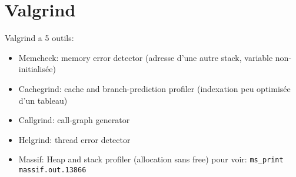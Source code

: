 \section{Valgrind}
Valgrind a 5 outils:
\begin{itemize}
\item Memcheck: memory error detector (adresse d'une autre stack, variable non-initialisée)
\item Cachegrind: cache and branch-prediction profiler (indexation peu optimisée d'un tableau)
\item Callgrind: call-graph generator
\item Helgrind: thread error detector
\item Massif: Heap and stack profiler (allocation sans free) pour voir: \verb!ms_print massif.out.13866!
\end{itemize}
